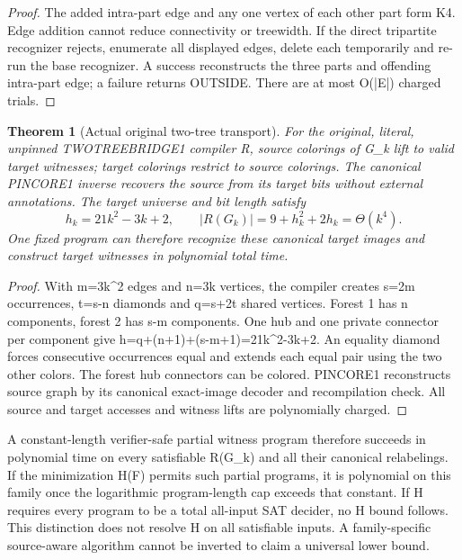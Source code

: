 \documentclass[11pt]{article}
\newtheorem{theorem}{Theorem}
\begin{document}
\begin{proof}
The added intra-part edge and any one vertex of each other part form K4. Edge addition cannot reduce connectivity or treewidth. If the direct tripartite recognizer rejects, enumerate all displayed edges, delete each temporarily and re-run the base recognizer. A success reconstructs the three parts and offending intra-part edge; a failure returns OUTSIDE. There are at most O(|E|) charged trials.
\end{proof}
\begin{theorem}[Actual original two-tree transport]
For the original, literal, unpinned TWOTREEBRIDGE1 compiler R, source colorings of G_k lift to valid target witnesses; target colorings restrict to source colorings. The canonical PINCORE1 inverse recovers the source from its target bits without external annotations. The target universe and bit length satisfy
\[
h_k=21k^2-3k+2,\qquad |R(G_k)|=9+h_k^2+2h_k=\Theta(k^4).
\]
One fixed program can therefore recognize these canonical target images and construct target witnesses in polynomial total time.
\end{theorem}
\begin{proof}
With m=3k^2 edges and n=3k vertices, the compiler creates s=2m occurrences, t=s-n diamonds and q=s+2t shared vertices. Forest 1 has n components, forest 2 has s-m components. One hub and one private connector per component give h=q+(n+1)+(s-m+1)=21k^2-3k+2. An equality diamond forces consecutive occurrences equal and extends each equal pair using the two other colors. The forest hub connectors can be colored. PINCORE1 reconstructs source graph by its canonical exact-image decoder and recompilation check. All source and target accesses and witness lifts are polynomially charged.
\end{proof}

A constant-length verifier-safe partial witness program therefore succeeds in polynomial time on every satisfiable R(G_k) and all their canonical relabelings. If the minimization H(F) permits such partial programs, it is polynomial on this family once the logarithmic program-length cap exceeds that constant. If H requires every program to be a total all-input SAT decider, no H bound follows. This distinction does not resolve H on all satisfiable inputs. A family-specific source-aware algorithm cannot be inverted to claim a universal lower bound.
\end{document}
